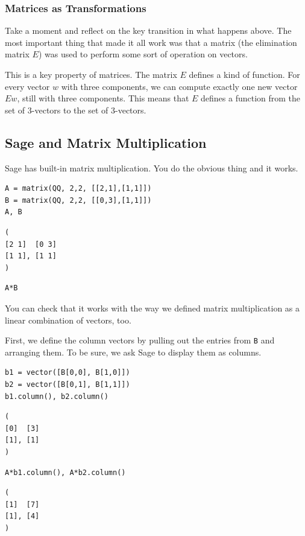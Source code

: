 \documentclass[10pt,]{book}
\theoremstyle{plain}
\theoremstyle{definition}
\numberwithin{equation}{section}
\begin{document}
\subsubsection[Matrices as Transformations]{Matrices as Transformations}\label{subsubsection-16}

        Take a moment and reflect on the key transition in what happens above.
        The most important thing that made it all work was that a matrix (the
        elimination matrix \(E\)) was used to perform some sort of operation on
        vectors.
\par

        This is a key property of matrices. The matrix \(E\) defines a kind of
        function. For every vector \(w\) with three components, we can compute
        exactly one new vector \(Ew\), still with three components. This means that
        \(E\) defines a function from the set of \(3\)-vectors to the set of
        \(3\)-vectors.
\typeout{************************************************}
\typeout{************************************************}
\subsection[Sage and Matrix Multiplication]{Sage and Matrix Multiplication}\label{subsection-32}

      Sage has built-in matrix multiplication. You do the obvious thing and it
      works.
\begin{lstlisting}[style=sageinput]
A = matrix(QQ, 2,2, [[2,1],[1,1]])
B = matrix(QQ, 2,2, [[0,3],[1,1]])
A, B
\end{lstlisting}
\begin{lstlisting}[style=sageoutput]
(
[2 1]  [0 3]
[1 1], [1 1]
)
\end{lstlisting}
\begin{lstlisting}[style=sageinput]
A*B
\end{lstlisting}
\par

      You can check that it works with the way we defined matrix multiplication
      as a linear combination of vectors, too.
\par

      First, we define the column vectors by pulling out the entries from \verb?B?
      and arranging them. To be sure, we ask Sage to display them as columns.
\begin{lstlisting}[style=sageinput]
b1 = vector([B[0,0], B[1,0]])
b2 = vector([B[0,1], B[1,1]])
b1.column(), b2.column()
\end{lstlisting}
\begin{lstlisting}[style=sageoutput]
(
[0]  [3]
[1], [1]
)
\end{lstlisting}
\begin{lstlisting}[style=sageinput]
A*b1.column(), A*b2.column()
\end{lstlisting}
\begin{lstlisting}[style=sageoutput]
(
[1]  [7]
[1], [4]
)
\end{lstlisting}
\par
\end{document}
